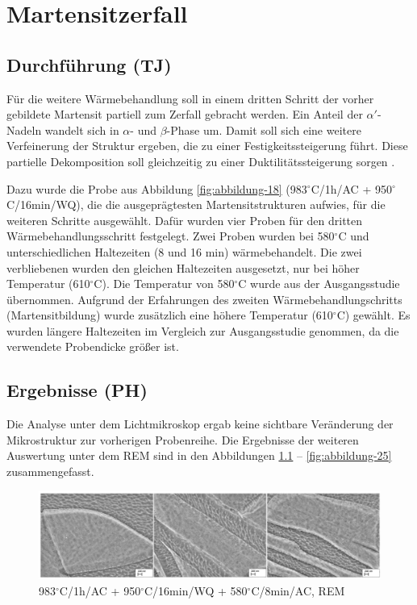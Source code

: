 \chapter{Martensitzerfall}

\section{Durchführung (TJ)}

Für die weitere Wärmebehandlung soll in einem dritten Schritt der vorher gebildete Martensit partiell zum Zerfall gebracht werden. Ein Anteil der $\alpha'$-Nadeln wandelt sich in $\alpha$- und $\beta$-Phase um. Damit soll sich eine weitere Verfeinerung der Struktur ergeben, die zu einer Festigkeitssteigerung führt. Diese partielle Dekomposition soll gleichzeitig zu einer Duktilitätssteigerung sorgen \cite{Lutjering.2007}.

Dazu wurde die Probe aus Abbildung \ref{fig:abbildung-18} (983$^\circ$C/1h/AC + 950$^\circ$C/16min/WQ), die die ausgeprägtesten Martensitstrukturen aufwies, für die weiteren Schritte ausgewählt. 
Dafür wurden vier Proben für den dritten Wärmebehandlungsschritt festgelegt. Zwei Proben wurden bei 580$^\circ$C und unterschiedlichen Haltezeiten (8 und 16 min) wärmebehandelt. Die zwei verbliebenen wurden den gleichen Haltezeiten ausgesetzt, nur bei höher Temperatur (610$^\circ$C).
Die Temperatur von 580$^\circ$C wurde aus der Ausgangsstudie übernommen. Aufgrund der Erfahrungen des zweiten Wärmebehandlungschritts (Martensitbildung) wurde zusätzlich eine höhere Temperatur (610$^\circ$C) gewählt.
Es wurden längere Haltezeiten im Vergleich zur Ausgangsstudie genommen, da die verwendete Probendicke größer ist.

\section{Ergebnisse (PH)}

Die Analyse unter dem Lichtmikroskop ergab keine sichtbare Veränderung der Mikrostruktur zur vorherigen Probenreihe. Die Ergebnisse der weiteren Auswertung unter dem REM sind in den Abbildungen \ref{fig:abbildung-22} -- \ref{fig:abbildung-25} zusammengefasst.

\begin{figure}
	\centering
	\includegraphics[width=1.0\linewidth]{./Bilder/Abbildung 22.png}
	\caption[Abbildung 22]{983$^\circ$C/1h/AC + 950$^\circ$C/16min/WQ + 580$^\circ$C/8min/AC, REM}
	\label{fig:abbildung-22}
\end{figure}

